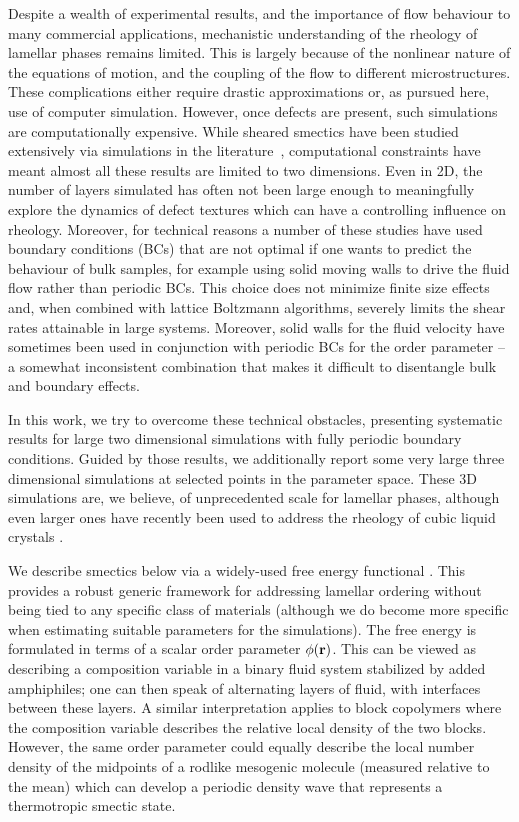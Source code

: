 \documentclass[8.5pt,twoside,twocolumn]{article}
\begin{document}
Despite a wealth of experimental results, and the importance of flow behaviour
to many commercial applications, mechanistic understanding of
the rheology of lamellar phases remains limited. This is largely
because of the nonlinear nature of the equations of motion, and the
coupling of the flow to different microstructures. These complications either require
drastic approximations or, as pursued here, use of computer
simulation. However, once defects are present, such simulations are computationally expensive. 
While sheared smectics have been studied extensively via simulations
in the literature~\cite{Swift96,Gonnella97,Gonnella98,Xu03,Xu05,Xu06a,Xu06b},
computational constraints have meant almost all these results are limited
to two dimensions. Even in 2D, the number of layers simulated has often not been large enough to meaningfully explore the dynamics of defect textures which can have a controlling influence on rheology. Moreover, for technical reasons a number of these studies have used boundary conditions (BCs) that are not optimal if one wants to predict the behaviour of bulk samples, for example using solid moving walls to drive the fluid flow rather than periodic BCs. This choice does not minimize finite size effects and, when combined with lattice Boltzmann algorithms, severely limits the shear rates attainable in large systems. Moreover, solid walls for the fluid velocity have sometimes been used in conjunction with periodic BCs for the order parameter \cite{Xu06b} -- a somewhat inconsistent combination that makes it difficult to disentangle bulk and boundary effects. 

In this work, we try to overcome these technical obstacles, presenting systematic results for large two dimensional simulations with fully periodic boundary conditions.
Guided by those results, we additionally report some very large three dimensional simulations at selected points in the parameter space. These 3D simulations are, we believe, of unprecedented scale for lamellar phases, although even larger ones have recently been used to address the rheology of cubic liquid crystals \cite{Saksena09a, Saksena09b}.

We describe smectics below via a widely-used free energy functional \cite{Gompper, Gonnella97, Xu06b, Cencini07}. This provides a robust generic framework for addressing lamellar ordering without being tied to any specific class of materials (although we do become more specific when estimating suitable parameters for the simulations). The free energy is formulated in terms of a scalar order parameter $\phi({\bf r})$. This can be viewed as describing a composition variable in a binary fluid system stabilized by added amphiphiles; one can then speak of alternating layers of fluid, with interfaces between these layers. A similar interpretation applies to block copolymers where the composition variable describes the relative local density of the two blocks. However, the same order parameter could equally describe the local number density of the midpoints of a rodlike mesogenic molecule (measured relative to the mean) which can develop a periodic density wave that represents a thermotropic smectic state.
\end{document}
